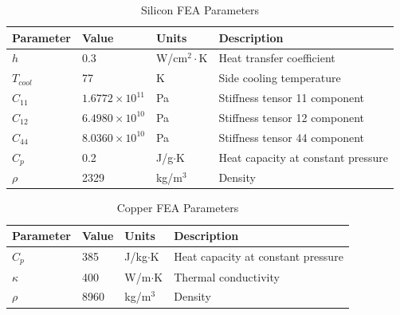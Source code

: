 \documentclass[preprint]{iucr}              %
\begin{document}
\begin{table}

\caption{Silicon FEA Parameters}
\begin{tabular}{@{}llll@{}}
Parameter   & Value                   & Units                     & Description                        \\
\hline
$h$           & 0.3                     & W/cm$^2\cdot$K          & Heat transfer coefficient          \\
$T_{cool}$  & 77                      & K                         & Side cooling temperature           \\
$C_{11}$    & $1.6772\times 10^{11}$  & Pa                        & Stiffness tensor 11 component      \\
$C_{12}$    & $6.4980\times 10^{10}$  & Pa                        & Stiffness tensor 12 component      \\
$C_{44}$    & $8.0360\times 10^{10}$  & Pa                        & Stiffness tensor 44 component      \\
$C_p$       & 0.2                     & J/g$\cdot$K               & Heat capacity at constant pressure \\
$\rho$      &  2329                   & kg/m$^3$                  & Density                            \\
\end{tabular}
\label{siliconFEA}
\end{table}


\begin{table}

\caption{Copper FEA Parameters}
\begin{tabular}{@{}llll@{}}
Parameter    & Value                  & Units                      & Description                        \\
\hline
$C_p$        & 385                    & J/kg$\cdot$K               & Heat capacity at constant pressure \\
$\kappa$     & 400                    & W/m$\cdot$K                & Thermal conductivity               \\ 
$\rho$       & 8960                   & kg/m$^3$                   & Density                            \\
\end{tabular}
\label{copperFEA}
\end{table}
\end{document}
